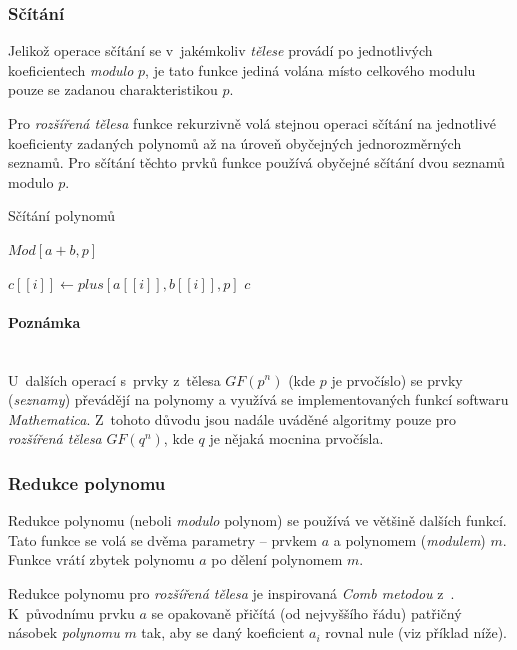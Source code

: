 \documentclass[thesis=M,czech,hidelinks]{FITthesis}[2012/06/26]
\newcommand{\0}{{\textcolor[gray]{0.80}{0}}}
\newenvironment{algoritmus}{
    \floatname{algorithm}{Algoritmus}
    \begin{algorithm}
}{\end{algorithm}}
\begin{document}
\subsubsection{Sčítání}
Jelikož operace sčítání se v~jakémkoliv \emph{tělese} provádí po jednotlivých
koeficientech \emph{modulo} $p$, je tato funkce jediná volána místo celkového
modulu pouze se zadanou charakteristikou $p$.

Pro \emph{rozšířená tělesa} funkce rekurzivně volá stejnou operaci sčítání na
jednotlivé koeficienty zadaných polynomů až na úroveň obyčejných jednorozměrných
seznamů. Pro sčítání těchto prvků funkce používá obyčejné sčítání dvou seznamů
modulo $p$.

\begin{algoritmus}[!ht]
    \caption{Sčítání polynomů}
    \begin{algorithmic}[1]
        \State \Return $Mod[a+b,p]$
     \EndFunction
    \end{algorithmic}
    \begin{algorithmic}[1]
            \State $c[[i]] \gets plus[a[[i]],b[[i]],p]$
        \EndFor
        \State \Return $c$
     \EndFunction
    \end{algorithmic}
\end{algoritmus}

\paragraph{Poznámka} \hfil \\
U~dalších operací s~prvky z~tělesa $GF(p^n)$ (kde $p$ je
prvočíslo) se prvky (\emph{seznamy}) převádějí na polynomy a využívá se
implementovaných funkcí softwaru \emph{Mathematica}. Z~tohoto důvodu jsou nadále
uváděné algoritmy pouze pro \emph{rozšířená tělesa} $GF(q^n)$, kde $q$ je nějaká
mocnina prvočísla.

\subsubsection{Redukce polynomu}
Redukce polynomu (neboli \emph{modulo} polynom) se používá ve většině dalších
funkcí. Tato funkce se volá se dvěma parametry -- prvkem $a$ a polynomem
(\emph{modulem}) $m$. Funkce vrátí zbytek polynomu $a$ po dělení polynomem $m$.

Redukce polynomu pro \emph{rozšířená tělesa} je inspirovaná \emph{Comb metodou}
z~\cite{Merchan}. K~původnímu prvku $a$ se opakovaně přičítá (od
nejvyššího řádu) patřičný násobek \emph{polynomu} $m$ tak, aby se daný
koeficient $a_i$ rovnal nule (viz příklad níže).
\end{document}
